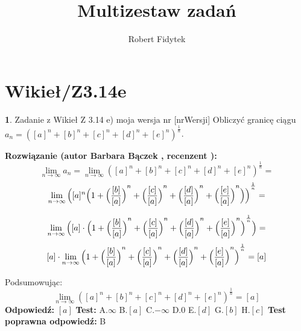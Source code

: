 \documentclass[12pt, a4paper]{article}
\title{Multizestaw zadań}
\author{Robert Fidytek}
\date{}
\theoremstyle{definition} %
\newtheorem{zad}{}
\newcommand{\kategoria}[1]{\section{#1}} %
\newcommand{\zadStart}[1]{\begin{zad}#1\newline} %
\newcommand{\zadStop}{\end{zad}}   %
\newcommand{\rozwStart}[2]{\noindent \textbf{Rozwiązanie (autor #1 , recenzent #2): }\newline} %
\newcommand{\rozwStop}{\newline}                                            %
\newcommand{\odpStart}{\noindent \textbf{Odpowiedź:}\newline}    %
\newcommand{\odpStop}{\newline}                                             %
\newcommand{\testStart}{\noindent \textbf{Test:}\newline} %
\newcommand{\testStop}{\newline} %
\newcommand{\kluczStart}{\noindent \textbf{Test poprawna odpowiedź:}\newline} %
\newcommand{\kluczStop}{\newline} %
\begin{document}
\maketitle


\kategoria{Wikieł/Z3.14e}
\zadStart{Zadanie z Wikieł Z 3.14 e) moja wersja nr [nrWersji]}
Obliczyć granicę ciągu $a_n= {([a]^n + [b]^n + [c]^n + [d]^n +[e]^n)}^{\frac{1}{n}}$.
\zadStop
\rozwStart{Barbara Bączek}{}
$$\lim_{n \rightarrow \infty} a_n= \lim_{n \rightarrow \infty} {([a]^n + [b]^n + [c]^n + [d]^n +[e]^n)}^{\frac{1}{n}}=$$
$$ \lim_{n \rightarrow \infty} {\Big{(}[a]^n\Big{(} 1 + {\Big{(}\frac{[b]}{[a]}\Big{)}}^n +  {\Big{(}\frac{[c]}{[a]}\Big{)}}^n +  {\Big{(}\frac{[d]}{[a]}\Big{)}}^n + {\Big{(}\frac{[e]}{[a]}\Big{)}}^n \Big{)}\Big{)}}^{\frac{1}{n}}= $$

$$ \lim_{n \rightarrow \infty} \Big{(}[a] \cdot {\Big{(} 1 + {\Big{(}\frac{[b]}{[a]}\Big{)}}^n +  {\Big{(}\frac{[c]}{[a]}\Big{)}}^n +  {\Big{(}\frac{[d]}{[a]}\Big{)}}^n + {\Big{(}\frac{[e]}{[a]}\Big{)}}^n \Big{)}}^{\frac{1}{n}} \Big{)}=$$
$$ [a] \cdot \lim_{n \rightarrow \infty} {\Big{(} 1 + {\Big{(}\frac{[b]}{[a]}\Big{)}}^n +  {\Big{(}\frac{[c]}{[a]}\Big{)}}^n +  {\Big{(}\frac{[d]}{[a]}\Big{)}}^n + {\Big{(}\frac{[e]}{[a]}\Big{)}}^n \Big{)}}^{\frac{1}{n}}= [a]$$

Podsumowując: $$\lim_{n \rightarrow \infty} {([a]^n + [b]^n + [c]^n + [d]^n +[e]^n)}^{\frac{1}{n}} = [a] $$
\rozwStop
\odpStart
$[a]$
\odpStop
\testStart
A.$\infty$
B.$[a]$
C.$-\infty$
D.$0$
E.$[d]$
G.$[b]$
H.$[c]$
\testStop
\kluczStart
B
\kluczStop
\end{document}
